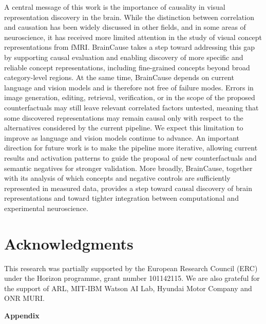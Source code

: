 \documentclass{article}
\begin{document}
A central message of this work is the importance of causality in visual representation discovery in the brain. While the distinction between correlation and causation has been widely discussed in other fields, and in some areas of neuroscience, it has received more limited attention in the study of visual concept representations from fMRI. BrainCause takes a step toward addressing this gap by supporting causal evaluation and enabling discovery of more specific and reliable concept representations, including fine-grained concepts beyond broad category-level regions. At the same time, BrainCause depends on current language and vision models and is therefore not free of failure modes. Errors in image generation, editing, retrieval, verification, or in the scope of the proposed counterfactuals may still leave relevant correlated factors untested, meaning that some discovered representations may remain causal only with respect to the alternatives considered by the current pipeline. We expect this limitation to improve as language and vision models continue to advance. An important direction for future work is to make the pipeline more iterative, allowing current results and activation patterns to guide the proposal of new counterfactuals and semantic negatives for stronger validation. More broadly, BrainCause, together with its analysis of which concepts and negative controls are sufficiently represented in measured data, provides a step toward causal discovery of brain representations and toward tighter integration between computational and experimental neuroscience.

\newpage

\section*{Acknowledgments}
This research was partially supported by the European Research Council (ERC) under the Horizon programme, grant number 101142115. We are also grateful for the support of ARL, MIT-IBM Watson AI Lab, Hyundai Motor Company and ONR MURI.








\newpage
\appendix
\begin{center}
    {\LARGE \bfseries Appendix}
\end{center}
\renewcommand{\thefigure}{S\arabic{figure}}  
\renewcommand{\thetable}{T\arabic{table}}    
\end{document}
